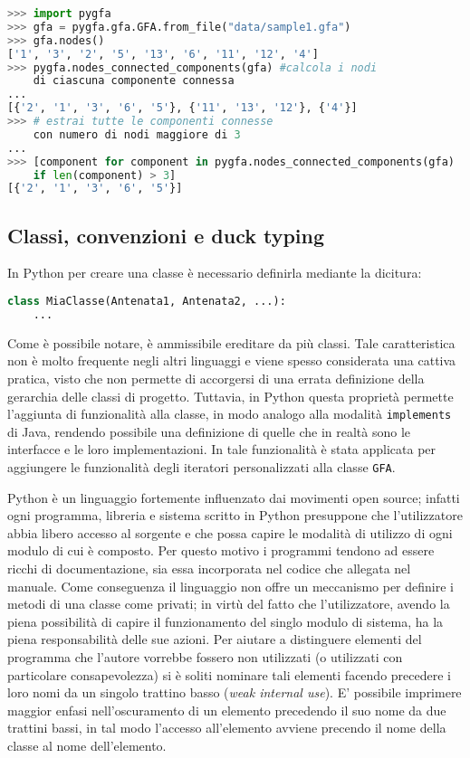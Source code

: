 \captionsetup{justification=centering, singlelinecheck=false}
\begin{lstlisting}[language=Python, frame=topline, caption=Un esempio  dell'espressività\\del linguaggio applicata a \pygfa.]
>>> import pygfa
>>> gfa = pygfa.gfa.GFA.from_file("data/sample1.gfa")
>>> gfa.nodes()
['1', '3', '2', '5', '13', '6', '11', '12', '4']
>>> pygfa.nodes_connected_components(gfa) #calcola i nodi
	di ciascuna componente connessa
...
[{'2', '1', '3', '6', '5'}, {'11', '13', '12'}, {'4'}]
>>> # estrai tutte le componenti connesse
	con numero di nodi maggiore di 3
...
>>> [component for component in pygfa.nodes_connected_components(gfa)
	if len(component) > 3]
[{'2', '1', '3', '6', '5'}]
\end{lstlisting}
\captionsetup{justification=justified, singlelinecheck=false}

\subsection{Classi, convenzioni e duck typing}
In Python per creare una classe è necessario definirla mediante
la dicitura:
\begin{lstlisting}[language=Python]
class MiaClasse(Antenata1, Antenata2, ...):
	...
\end{lstlisting}
Come è possibile notare, è ammissibile ereditare da più classi.
Tale caratteristica non è molto frequente negli altri linguaggi e
viene spesso considerata una cattiva pratica, visto che non
permette di accorgersi di una errata definizione della gerarchia delle
classi di progetto. Tuttavia, in Python questa proprietà permette
l'aggiunta di funzionalità alla classe, in modo analogo alla modalità
\texttt{implements} di Java, rendendo possibile una definizione di
quelle che in realtà sono le interfacce e le loro implementazioni.
In \pygfa tale funzionalità è stata applicata per aggiungere le
funzionalità degli iteratori personalizzati alla classe \texttt{GFA}.

Python è un linguaggio fortemente influenzato dai movimenti
open source; infatti ogni programma, libreria e sistema scritto in Python
presuppone che l'utilizzatore abbia libero accesso al sorgente e che
possa capire le modalità di utilizzo di ogni modulo di cui è composto.
Per questo motivo i programmi tendono ad essere ricchi di documentazione,
sia essa incorporata nel codice che allegata nel manuale.
Come conseguenza il linguaggio non offre un meccanismo per definire i
metodi di una classe come privati; in virtù del fatto che l'utilizzatore, avendo
la piena possibilità di capire il funzionamento del singlo modulo di sistema,
ha la piena responsabilità delle sue azioni.
Per aiutare a distinguere elementi del programma che l'autore vorrebbe
fossero non utilizzati (o utilizzati con particolare consapevolezza) si è
soliti nominare tali elementi facendo precedere i loro nomi da un singolo
trattino basso (\emph{weak internal use}). E' possibile imprimere
maggior enfasi nell'oscuramento di un elemento precedendo
il suo nome da due trattini bassi, in tal modo l'accesso
all'elemento avviene precendo il nome della classe al nome dell'elemento.

